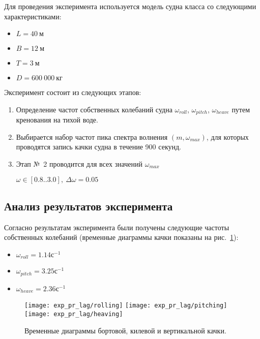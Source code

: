 Для проведения эксперимента используется модель судна класса  со следующими характеристиками:
\begin{itemize}
	\item	$L = 40\ \text{м}$
	\item	$B = 12\ \text{м}$
	\item	$T = 3\ \text{м}$
	\item	$D = 600\ 000\ \text{кг}$
\end{itemize}

Эксперимент состоит из следующих этапов:
\begin{enumerate}
	\item	Определение частот собственных колебаний судна 
			$\omega_{roll}$, $\omega_{pitch}$, $\omega_{heave}$ путем кренования на тихой воде.
	\item	Выбирается набор частот пика спектра волнения $(m, \omega_{max})$, для которых
			проводятся запись качки судна в течение 900 секунд.
	\item	Этап №~2 проводится для всех значений $\omega_{max}$
			
			$\omega \in [0.8..3.0],\ \Delta\omega=0.05$ 

\end{enumerate}

\subsection{Анализ результатов эксперимента}

Согласно результатам эксперимента были получены следующие частоты собственных колебаний (временные диаграммы качки показаны на рис.~\ref{exp_pr_rolling_lag}):
\begin{itemize}
	\item	$ \omega_{roll} = 1.14 \text{с}^{-1}$
	\item	$ \omega_{pitch} = 3.25 \text{с}^{-1}$
	\item	$ \omega_{heave} = 2.36 \text{с}^{-1}$
\end{itemize}

\begin{figure}[ht]
	\begin{center}
	\texttt{[image: exp\_pr\_lag/rolling]}
	\texttt{[image: exp\_pr\_lag/pitching]}
	\texttt{[image: exp\_pr\_lag/heaving]}
	\end{center}
	\caption{Временные диаграммы бортовой, килевой и вертикальной качки.}
	\label{exp_pr_rolling_lag}
\end{figure}

